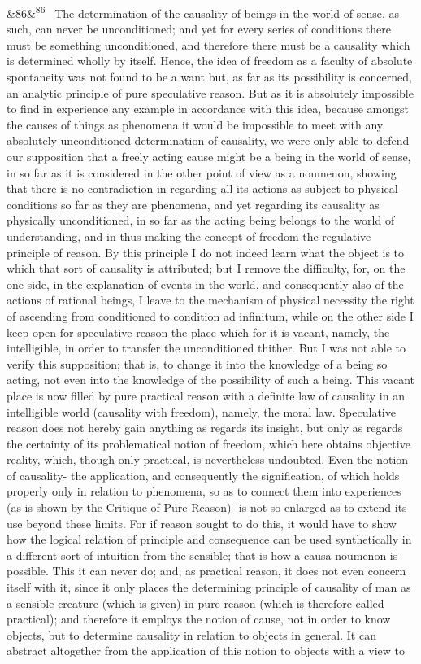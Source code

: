 \documentclass[12pt]{article}
\newcommand{\para}[1][]{\par\noindent\ifx&#1&\else\textsuperscript{\footnotesize #1}~\fi}
\begin{document}
\para[86] The determination of the causality of beings in the world of sense, as such, can never be unconditioned; and yet for every series of conditions there must be something unconditioned, and therefore there must be a causality which is determined wholly by itself. Hence, the idea of freedom as a faculty of absolute spontaneity was not found to be a want but, as far as its possibility is concerned, an analytic principle of pure speculative reason. But as it is absolutely impossible to find in experience any example in accordance with this idea, because amongst the causes of things as phenomena it would be impossible to meet with any absolutely unconditioned determination of causality, we were only able to defend our supposition that a freely acting cause might be a being in the world of sense, in so far as it is considered in the other point of view as a noumenon, showing that there is no contradiction in regarding all its actions as subject to physical conditions so far as they are phenomena, and yet regarding its causality as physically unconditioned, in so far as the acting being belongs to the world of understanding, and in thus making the concept of freedom the regulative principle of reason. By this principle I do not indeed learn what the object is to which that sort of causality is attributed; but I remove the difficulty, for, on the one side, in the explanation of events in the world, and consequently also of the actions of rational beings, I leave to the mechanism of physical necessity the right of ascending from conditioned to condition ad infinitum, while on the other side I keep open for speculative reason the place which for it is vacant, namely, the intelligible, in order to transfer the unconditioned thither. But I was not able to verify this supposition; that is, to change it into the knowledge of a being so acting, not even into the knowledge of the possibility of such a being. This vacant place is now filled by pure practical reason with a definite law of causality in an intelligible world (causality with freedom), namely, the moral law. Speculative reason does not hereby gain anything as regards its insight, but only as regards the certainty of its problematical notion of freedom, which here obtains objective reality, which, though only practical, is nevertheless undoubted. Even the notion of causality- the application, and consequently the signification, of which holds properly only in relation to phenomena, so as to connect them into experiences (as is shown by the Critique of Pure Reason)- is not so enlarged as to extend its use beyond these limits. For if reason sought to do this, it would have to show how the logical relation of principle and consequence can be used synthetically in a different sort of intuition from the sensible; that is how a causa noumenon is possible. This it can never do; and, as practical reason, it does not even concern itself with it, since it only places the determining principle of causality of man as a sensible creature (which is given) in pure reason (which is therefore called practical); and therefore it employs the notion of cause, not in order to know objects, but to determine causality in relation to objects in general. It can abstract altogether from the application of this notion to objects with a view to 
\end{document}

